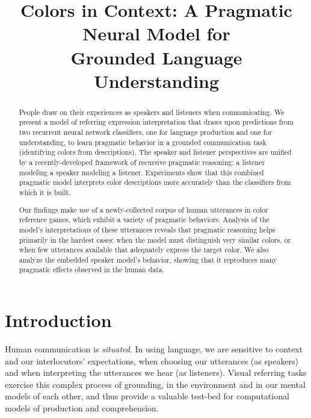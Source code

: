 \documentclass[11pt,letterpaper]{article}
\title{Colors in Context: A Pragmatic Neural Model for \\
Grounded Language Understanding}
\author{}
\date{}
\renewcommand{\|}{\mid}
\begin{document}
\maketitle
\begin{abstract}


People draw on their experiences as speakers and listeners when communicating.
We present a model of referring expression interpretation that draws upon predictions
from two recurrent neural network classifiers, one for language production and one for
understanding, to learn pragmatic behavior in a grounded communication task
(identifying colors from descriptions). The speaker and listener perspectives
are unified by a recently-developed framework of recursive pragmatic reasoning: a 
listener modeling a speaker modeling a listener. Experiments show that this
combined pragmatic model interprets color descriptions 
more accurately than the classifiers from which it is built.

Our findings make use of a newly-collected corpus of human utterances in
color reference games, which exhibit a variety of pragmatic behaviors.
Analysis of the model's interpretations of these utterances reveals that
pragmatic reasoning helps primarily
in the hardest cases: when the model must distinguish very similar colors,
or when few utterances available that adequately express
the target color. We also analyze the embedded speaker model's behavior,
showing that it reproduces many pragmatic effects observed in the human data.

\end{abstract}

\section{Introduction} \label{sec:intro}


Human communication is \emph{situated}. In using language, we are sensitive
to context and our interlocutors' expectations, when choosing our
utterances (as speakers) and when interpreting the utterances we hear (as listeners).
Visual referring tasks exercise this complex process of grounding, 
in the environment and in
our mental models of each other, and thus provide a valuable test-bed for
computational models of production and comprehension.
\end{document}
